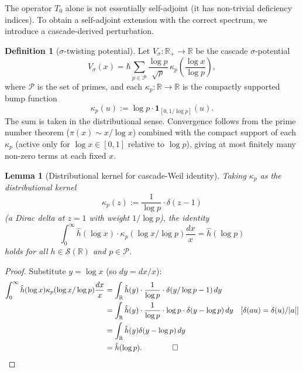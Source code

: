 \documentclass[11pt, a4paper]{amsart}
\newtheorem{lemma}[theorem]{Lemma}
\theoremstyle{definition}
\newtheorem{definition}[theorem]{Definition}
\newcommand{\R}{\mathbb{R}}
\begin{document}
The operator $T_0$ alone is not essentially self-adjoint (it has
non-trivial deficiency indices). To obtain a self-adjoint extension
with the correct spectrum, we introduce a cascade-derived perturbation.

\begin{definition}[$\sigma$-twisting potential]\label{def:Vsigma}
Let $V_\sigma : \R_+ \to \R$ be the cascade $\sigma$-potential
\[
V_\sigma(x) = \hbar \sum_{p \in \mathcal{P}} \frac{\log p}{\sqrt{p}}
\, \kappa_p\!\left(\frac{\log x}{\log p}\right),
\]
where $\mathcal{P}$ is the set of primes, and each $\kappa_p :
\R \to \R$ is the compactly supported bump function
\[
\kappa_p(u) := \log p \cdot \mathbf{1}_{[0, 1/\log p]}(u).
\]
The sum is taken in the distributional sense. Convergence follows
from the prime number theorem ($\pi(x) \sim x/\log x$) combined with
the compact support of each $\kappa_p$ (active only for
$\log x \in [0, 1]$ relative to $\log p$), giving at most finitely
many non-zero terms at each fixed $x$.
\end{definition}

\begin{lemma}[Distributional kernel for cascade-Weil identity]\label{lem:weilkernel}
Taking $\kappa_p$ as the distributional kernel
\[
\kappa_p(z) := \frac{1}{\log p} \cdot \delta(z - 1)
\]
(a Dirac delta at $z = 1$ with weight $1/\log p$), the identity
\begin{equation}\label{eq:weilid}
\int_0^\infty \hat h(\log x) \cdot \kappa_p(\log x / \log p) \frac{dx}{x}
= \hat h(\log p)
\end{equation}
holds for all $h \in \mathcal{S}(\R)$ and $p \in \mathcal{P}$.
\end{lemma}

\begin{proof}
Substitute $y = \log x$ (so $dy = dx/x$):
\begin{align*}
\int_0^\infty \hat h(\log x) \kappa_p(\log x / \log p) \frac{dx}{x}
&= \int_\R \hat h(y) \cdot \frac{1}{\log p} \cdot \delta(y/\log p - 1) \, dy \\
&= \int_\R \hat h(y) \cdot \frac{1}{\log p} \cdot \log p \cdot \delta(y - \log p) \, dy
\quad [\delta(au) = \delta(u)/|a|] \\
&= \int_\R \hat h(y) \delta(y - \log p) \, dy \\
&= \hat h(\log p). \qquad \qed
\end{align*}
\end{proof}
\end{document}
